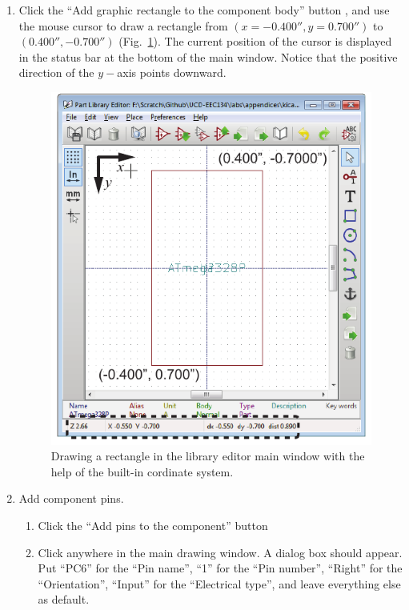 \documentclass[12pt,letterpaper]{scrartcl}
\begin{document}
\begin{enumerate}
	\item Click the ``Add graphic rectangle to the component body'' button , and use the mouse cursor to draw a rectangle from $(x=-0.400'', y=0.700'')$ to $(0.400'',-0.700'')$ (Fig.~\ref{fig:draw-rectangle-symbol}). The current position of the cursor is displayed in the status bar at the bottom of the main window. Notice that the positive direction of the $y-$axis points downward. 
		\begin{figure}[h]
			\centering
			\includegraphics{draw-rectangle-symbol.pdf}
			\caption{Drawing a rectangle in the library editor main window with the help of the built-in cordinate system.}
			\label{fig:draw-rectangle-symbol}
		\end{figure}
		
	\item Add component pins. 
		\begin{enumerate}
			\item Click the ``Add pins to the component'' button 
			
			\item Click anywhere in the main drawing window. A dialog box should appear. Put ``PC6'' for the ``Pin name'', ``1'' for the ``Pin number'', ``Right'' for the ``Orientation'', ``Input'' for the ``Electrical type'', and leave everything else as default. 
			

\end{enumerate}
\end{enumerate}
\end{document}
